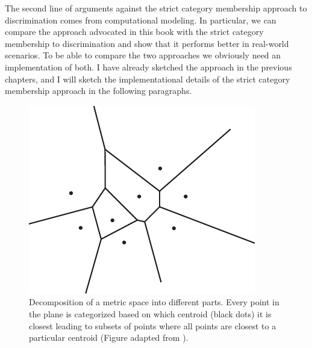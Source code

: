 The second line of arguments against the strict category membership 
approach to discrimination comes from computational modeling. In particular, we
can compare the approach advocated in this book with the strict category membership 
to discrimination and show that it performs better
in real-world scenarios. To be able to compare the two approaches
we obviously need an implementation of both. I have already sketched
the approach in the previous chapters, and I will sketch the implementational
details of the strict category membership approach in the following paragraphs.

\begin{figure}
\begin{center}
\includegraphics[width=0.3\columnwidth]{figs/voronoi}
\end{center}
\caption[Voronoi tesselation]{Decomposition of a metric space into different parts.
Every point in the plane is categorized based on which
centroid (black dots) it is closest leading to subsets of
points where all points are closest to a particular centroid (Figure adapted from 
\citealp{aurenhammer1991voronoi}).}
\label{f:voronoi}
\end{figure}

